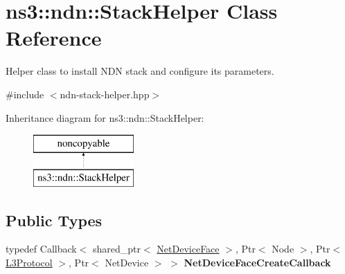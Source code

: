 \hypertarget{classns3_1_1ndn_1_1StackHelper}{}\section{ns3\+:\+:ndn\+:\+:Stack\+Helper Class Reference}
\label{classns3_1_1ndn_1_1StackHelper}


Helper class to install N\+DN stack and configure its parameters.  




{\ttfamily \#include $<$ndn-\/stack-\/helper.\+hpp$>$}

Inheritance diagram for ns3\+:\+:ndn\+:\+:Stack\+Helper\+:\begin{figure}[H]
\begin{center}
\leavevmode
\includegraphics[height=2.000000cm]{classns3_1_1ndn_1_1StackHelper}
\end{center}
\end{figure}
\subsection*{Public Types}
\begin{DoxyCompactItemize}
\item 
typedef Callback$<$ shared\+\_\+ptr$<$ \hyperlink{classns3_1_1ndn_1_1NetDeviceFace}{Net\+Device\+Face} $>$, Ptr$<$ Node $>$, Ptr$<$ \hyperlink{classns3_1_1ndn_1_1L3Protocol}{L3\+Protocol} $>$, Ptr$<$ Net\+Device $>$ $>$ {\bfseries Net\+Device\+Face\+Create\+Callback}\hypertarget{classns3_1_1ndn_1_1StackHelper_ac1c64988ec952225be76fefda0c7b54e}{}\label{classns3_1_1ndn_1_1StackHelper_ac1c64988ec952225be76fefda0c7b54e}

\end{DoxyCompactItemize}
